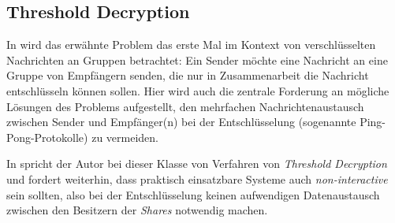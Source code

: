 \subsection{Threshold Decryption}


\label{sec_basics_threshold_thresholddecryption}

In \cite{desmedt1987} wird das erwähnte Problem das erste Mal im Kontext von verschlüsselten Nachrichten an Gruppen betrachtet: Ein Sender möchte eine Nachricht an eine Gruppe von Empfängern senden, die nur in Zusammenarbeit die Nachricht entschlüsseln können sollen. Hier wird auch die zentrale Forderung an mögliche Lösungen des Problems aufgestellt, den mehrfachen Nachrichtenaustausch zwischen Sender und Empfänger(n) bei der Entschlüsselung (sogenannte Ping-Pong-Protokolle) zu vermeiden. 

In \cite{desmedt1993} spricht der Autor bei dieser Klasse von Verfahren von \textit{Threshold Decryption} und fordert weiterhin, dass praktisch einsatzbare Systeme auch \textit{non-interactive} sein sollten, also bei der Entschlüsselung keinen aufwendigen Datenaustausch zwischen den Besitzern der \textit{Shares} notwendig machen.

